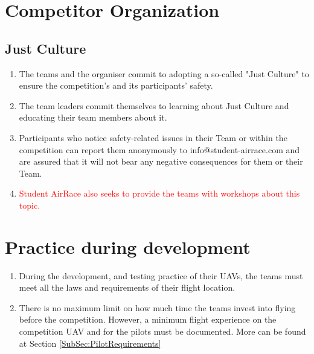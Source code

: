     \section{Competitor Organization}

    \subsection{Just Culture}
    \begin{enumerate}
      \item The teams and the organiser commit to adopting a so-called "Just Culture" to ensure the competition's and its participants' safety.
      \item The team leaders commit themselves to learning about Just Culture and educating their team members about it.
      \item Participants who notice safety-related issues in their Team or within the competition can report them anonymously to info@student-airrace.com and are assured that it will not bear any
      negative consequences for them or their Team. 
      \item \textcolor{red}{Student AirRace also seeks to provide the teams with workshops about this topic.}
    \end{enumerate}

    \section{Practice during development}
    \begin{enumerate}
      \item During the development, and testing practice of their UAVs, the teams must meet all the laws and requirements of their flight location. 
      \item There is no maximum limit on how much time the teams invest into flying before the competition. However, a minimum flight experience on the competition UAV and for the pilots must be documented. More can be found at Section \ref{SubSec:PilotRequirements}
    \end{enumerate}

